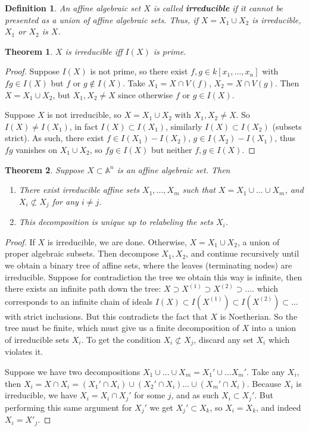 \documentclass[12pt]{article}
\newcommand{\A}{\mathbb{A}}
\newtheorem{definition}{Definition}[section]
\newtheorem{theorem}{Theorem}[section]
\begin{document}
    \begin{definition}
        An affine algebraic set $X$ is called \textbf{irreducible} if it cannot be presented as a union of affine algebraic sets. Thus, if $X = X_1 \cup X_2$ is irreducible, $X_1$ or $X_2$ is $X$. 
    \end{definition}
    \begin{theorem} \label{thm:irr_iff_prime}
        $X$ is irreducible iff $I(X)$ is prime. 
    \end{theorem}
    \begin{proof}
        Suppose $I(X)$ is not prime, so there exist $f, g \in k[x_1, \dots, x_n]$ with $fg \in I(X)$ but $f$ or $g \not \in I(X)$. Take $X_1 = X \cap V(f)$, $X_2 = X \cap V(g)$. Then $X = X_1 \cup X_2$, but $X_1, X_2 \neq X$ since otherwise $f$ or $g \in I(X)$. \par 
        Suppose $X$ is not irreducible, so $X = X_1 \cup X_2$ with $X_1, X_2 \neq X$. So $I(X) \neq I(X_1)$, in fact $I(X) \subset I(X_1)$, similarly $I(X) \subset I(X_2)$ (subsets strict). As such, there exist $f \in I(X_1) - I(X_2)$, $g \in I(X_2) - I(X_1)$, thus $fg$ vanishes on $X_1 \cup X_2$, so $fg \in I(X)$ but neither $f, g \in I(X)$. 
    \end{proof}
    \begin{theorem}
        Suppose $X \subset \A^n$ is an affine algebraic set. Then
        \begin{enumerate}
            \item There exist irreducible affine sets $X_1, \dots, X_m$ such that $X = X_1 \cup \dots \cup X_m$, and $X_i \not \subset X_j$ for any $i \neq j$. 
            \item This decomposition is unique up to relabeling the sets $X_i$. 
        \end{enumerate} 
    \end{theorem}
    \begin{proof}
        If $X$ is irreducible, we are done. Otherwise, $X = X_1 \cup X_2$, a union of proper algebraic subsets. Then decompose $X_1, X_2$, and continue recursively until we obtain a binary tree of affine sets, where the leaves (terminating nodes) are irreducible. Suppose for contradiction the tree we obtain this way is infinite, then there exists an infinite path down the tree: $X \supset X^{(1)} \supset X^{(2)} \supset \dots $. which corresponds to an infinite chain of ideals $I(X) \subset I(X^{(1)}) \subset I(X^{(2)}) \subset \dots $ with strict inclusions. But this contradicts the fact that $X$ is Noetherian. So the tree must be finite, which must give us a finite decomposition of $X$ into a union of irreducible sets $X_i$. To get the condition $X_i \not \subset X_j$, discard any set $X_i$ which violates it. \par 
        Suppose we have two decompositions $X_1 \cup \dots \cup X_m = X_1' \cup \dots X_m'$. Take any $X_i$, then $X_i = X \cap X_i = (X_1' \cap X_i) \cup (X_2' \cap X_i) \dots \cup (X_m' \cap X_i)$. Because $X_i$ is irreducible, we have $X_i = X_i \cap X_j'$ for some $j$, and as such $X_i \subset X_j'$. But performing this same argument for $X_j'$ we get $X_j' \subset X_k$, so $X_i = X_k$, and indeed $X_i = X'_j$. 
    \end{proof}
\end{document}
